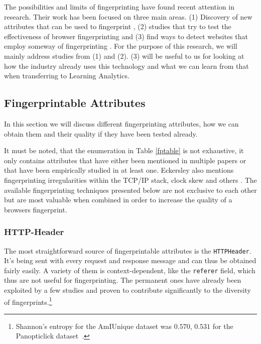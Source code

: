 The possibilities and limits of fingerprinting have found recent attention in research. Their work has been focused on three main areas. (1) Discovery of new attributes that can be used to fingerprint \cite{murdoch_hot_2006,mowery_pixel_2012,fifield_fingerprinting_2015}, (2) studies that try to test the effectiveness of browser fingerprinting \cite{laperdrix_beauty_2016,eckersley_how_2010,nikiforakis_cookieless_2013} and (3) find ways to detect websites that employ someway of fingerprinting \cite{nikiforakis_cookieless_2013,acar_fpdetective_2013,acar_web_2014}. 
For the purpose of this research, we will mainly address studies from (1) and (2). (3) will be useful to us for looking at how the industry already uses this technology and what we can learn from that when transferring to Learning Analytics.

\subsection{Fingerprintable Attributes}
\label{subsec:fpatt}

In this section we will discuss different fingerprinting attributes, how we can obtain them and their quality if they have been tested already.

It must be noted, that the enumeration in Table \ref{fptable} is not exhaustive, it only contains attributes that have either been mentioned in multiple papers or that have been empirically studied in at least one. Eckersley also mentions fingerprinting irregularities within the TCP/IP stack, clock skew and others \cite{eckersley_how_2010}.
The available fingerprinting techniques presented below are not exclusive to each other but are most valuable when combined in order to increase the quality of a browsers fingerprint.
\subsubsection{HTTP-Header}
\label{sota:httpheader}
The most straightforward source of fingerprintable attributes is the \texttt{HTTP\-Header}. It's being sent with every request and response message and can thus be obtained fairly easily. A variety of them is context-dependent, like the \texttt{referer} field, which thus are not useful for fingerprinting. The permanent ones have already been exploited by a few studies \cite{laperdrix_beauty_2016,eckersley_how_2010} and proven to contribute significantly to the diversity of fingerprints.\footnote{Shannon's entropy for the AmIUnique dataset was $0.570$, $0.531$ for the Panopticlick dataset \cite{laperdrix_beauty_2016}.} 

